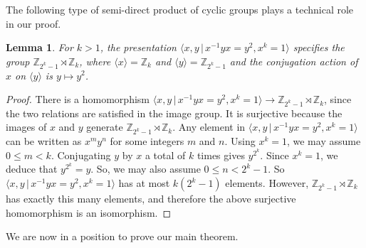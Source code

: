 \documentclass[11pt,oneside]{amsart}
\newtheorem{lemma}[theorem]{Lemma}
\begin{document}
The following type of semi-direct product of cyclic groups plays a technical role in our proof.

\begin{lemma}
\label{Lem:SemiDirect}
For $k > 1$, the presentation $\langle x, y \, | \, x^{-1} y x = y^2, x^k = 1 \rangle$ specifies the group $\mathbb{Z}_{2^k-1} \rtimes \mathbb{Z}_k$, where $\langle x \rangle = \mathbb{Z}_k$ and $\langle y \rangle = \mathbb{Z}_{2^k-1}$ and the conjugation action of $x$ on $\langle y \rangle$ is $y \mapsto y^2$.
\end{lemma}

\begin{proof}
There is a homomorphism $\langle x, y \, | \, x^{-1} y x = y^2, x^k = 1 \rangle \rightarrow \mathbb{Z}_{2^k-1} \rtimes \mathbb{Z}_k$, since the two relations are satisfied in the image group. It is surjective because the images of $x$ and $y$ generate $\mathbb{Z}_{2^k-1} \rtimes \mathbb{Z}_k$. Any element in $\langle x, y \, | \, x^{-1} y x = y^2, x^k = 1 \rangle$ can be written as $x^m y^n$ for some integers $m$ and $n$. Using $x^k = 1$, we may assume $0 \leq m < k$. Conjugating $y$ by $x$ a total of $k$ times gives $y^{2^k}$. Since $x^k = 1$, we deduce that $y^{2^k} = y$. So, we may also assume $0 \leq n < 2^{k}-1$. So $\langle x, y \, | \, x^{-1} y x = y^2, x^k = 1 \rangle$ has at most $k(2^k -1)$ elements. However, $\mathbb{Z}_{2^k-1} \rtimes \mathbb{Z}_k$ has exactly this many elements, and therefore the above surjective homomorphism is an isomorphism.
\end{proof}

We are now in a position to prove our main theorem.
\end{document}
